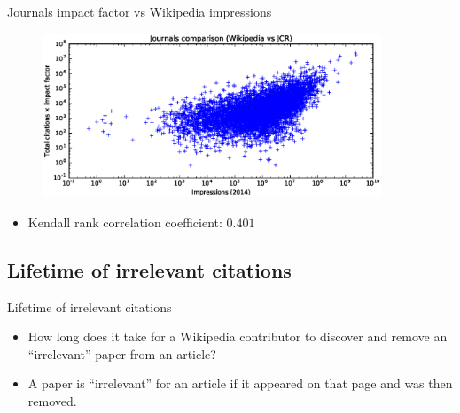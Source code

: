 \documentclass{beamer}
\begin{document}
\begin{frame}{Journals impact factor vs Wikipedia impressions}
    \begin{figure}
    \centering
    \includegraphics[width=0.9\textwidth]{assets/journals_compare_impressions2014}
    \end{figure}

    \begin{itemize}
        \item Kendall rank correlation coefficient: $0.401$
    \end{itemize}
\end{frame}
%

\subsection{Lifetime of irrelevant citations}
\begin{frame}{Lifetime of irrelevant citations}
    \begin{itemize}
        \item How long does it take for a Wikipedia contributor to discover and remove an ``irrelevant'' paper from an article?
        \item A paper is ``irrelevant'' for an article if it appeared on that page and was then removed.
    \end{itemize}
\end{frame}
\end{document}
